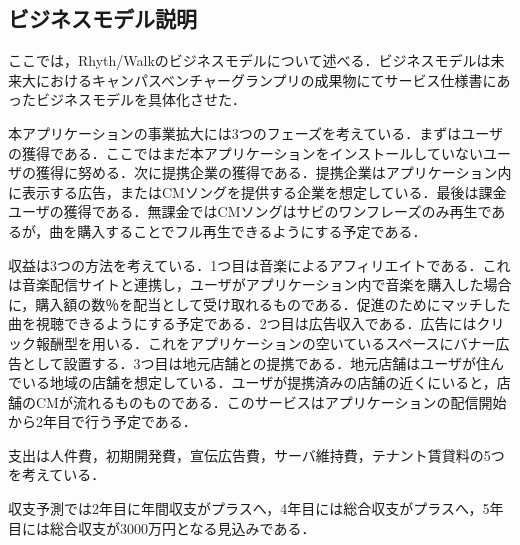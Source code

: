 \subsection{ビジネスモデル説明}
\par ここでは，Rhyth/Walkのビジネスモデルについて述べる．ビジネスモデルは未来大におけるキャンパスベンチャーグランプリの成果物にてサービス仕様書にあったビジネスモデルを具体化させた．
\par 本アプリケーションの事業拡大には3つのフェーズを考えている．まずはユーザの獲得である．ここではまだ本アプリケーションをインストールしていないユーザの獲得に努める．次に提携企業の獲得である．提携企業はアプリケーション内に表示する広告，またはCMソングを提供する企業を想定している．最後は課金ユーザの獲得である．無課金ではCMソングはサビのワンフレーズのみ再生であるが，曲を購入することでフル再生できるようにする予定である．
\par 収益は3つの方法を考えている．1つ目は音楽によるアフィリエイトである．これは音楽配信サイトと連携し，ユーザがアプリケーション内で音楽を購入した場合に，購入額の数％を配当として受け取れるものである．促進のためにマッチした曲を視聴できるようにする予定である．2つ目は広告収入である．広告にはクリック報酬型を用いる．これをアプリケーションの空いているスペースにバナー広告として設置する．3つ目は地元店舗との提携である．地元店舗はユーザが住んでいる地域の店舗を想定している．ユーザが提携済みの店舗の近くにいると，店舗のCMが流れるものものである．このサービスはアプリケーションの配信開始から2年目で行う予定である．
\par 支出は人件費，初期開発費，宣伝広告費，サーバ維持費，テナント賃貸料の5つを考えている．
\par 収支予測では2年目に年間収支がプラスへ，4年目には総合収支がプラスへ，5年目には総合収支が3000万円となる見込みである．
